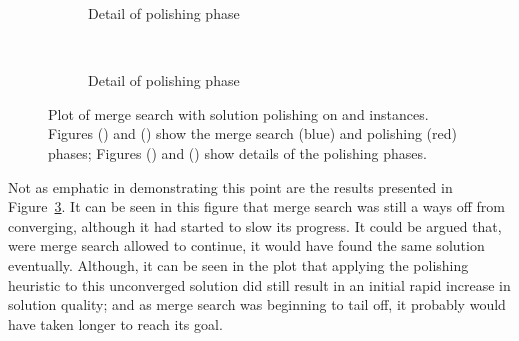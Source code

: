 \documentclass[preprint]{elsarticle}
\begin{document}
\begin{figure}[h]
    \centering
    \begin{subfigure}[t]{0.4\textwidth}
    \centering
    \vspace*{-5mm}\caption{\zuckmed{}}
    \label{plot:polish.med1}
    \end{subfigure}
    \qquad \qquad
    \begin{subfigure}[t]{0.4\textwidth}
    \centering
    \caption{Detail of polishing phase}
    \label{plot:polish.med2}
    \end{subfigure}
    \\[0.5cm]
    \centering
    \begin{subfigure}[t]{0.4\textwidth}
    \centering
    \vspace*{-5mm}\caption{\zucklarge{}}
    \label{plot:polish.large1}
    \end{subfigure}
    \qquad \qquad
    \begin{subfigure}[t]{0.4\textwidth}
    \centering
    \vspace*{-5mm}\caption{Detail of polishing phase}
    \label{plot:polish.large2}
    \end{subfigure}
    \caption[Plot of merge search with solution polishing on \zuckmed{} and \zucklarge{} instances]{Plot of merge search with solution polishing on \zuckmed{} and \zucklarge{} instances. Figures () and () show the merge search (blue) and polishing (red) phases; Figures () and () show details of the polishing phases.}
    \label{plot:mine:polish}
\end{figure}

Not as emphatic in demonstrating this point are the results presented in Figure~\ref{plot:polish.large1}. It can be seen in this figure that merge search was still a ways off from converging, although it had started to slow its progress. It could be argued that, were merge search allowed to continue, it would have found the same solution eventually. Although, it can be seen in the plot that applying the polishing heuristic to this unconverged solution did still result in an initial rapid increase in solution quality; and as merge search was beginning to tail off, it probably would have taken longer to reach its goal.
\end{document}
